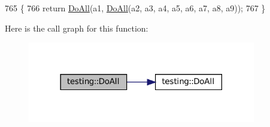 \begin{DoxyCode}
765                                         \{
766   \textcolor{keywordflow}{return} \hyperlink{namespacetesting_a79ac222c485c7aa0a1774bee17dadb10}{DoAll}(a1, \hyperlink{namespacetesting_a79ac222c485c7aa0a1774bee17dadb10}{DoAll}(a2, a3, a4, a5, a6, a7, a8, a9));
767 \}
\end{DoxyCode}
Here is the call graph for this function\+:
\nopagebreak
\begin{figure}[H]
\begin{center}
\leavevmode
\includegraphics[width=282pt]{namespacetesting_a3479e234532d82d0a093f7ffdb3ac254_cgraph}
\end{center}
\end{figure}
\mbox{\label{namespacetesting_a79ac222c485c7aa0a1774bee17dadb10}} 
